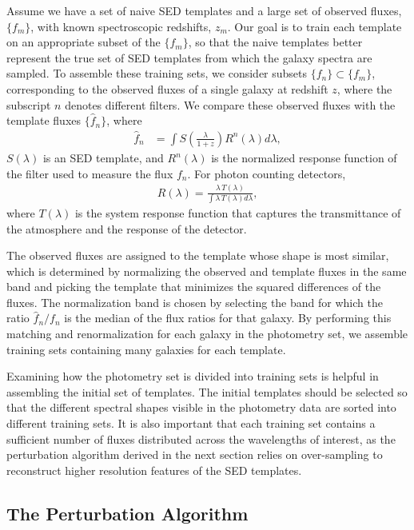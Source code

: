 Assume we have a set of naive SED templates and a large set of observed fluxes, $\{f_m\}$, with known spectroscopic redshifts, $z_m$. 
Our goal is to train each template on an appropriate subset of the $\{f_m\}$, so that the naive templates better represent the true set of SED templates from which the galaxy spectra are sampled. 
To assemble these training sets, we consider subsets $\{f_n\} \subset \{f_m\}$, corresponding to the observed fluxes of a single galaxy at redshift $z$, where the subscript $n$ denotes different filters. 
We compare these observed fluxes with the template fluxes $\{\hat{f}_n\}$, where
\begin{align}
    \hat{f}_n &= \int S\left(\frac{\lambda}{1+z}\right) R^n(\lambda) d\lambda, \label{eq:calc_flux1}
\end{align}
$S(\lambda)$ is an SED template, and $R^n(\lambda)$ is the normalized response function of the filter used to measure the flux $f_n$.
For photon counting detectors,
\begin{align}
    R(\lambda) = \frac{\lambda \, T(\lambda)}{\int \lambda \, T(\lambda) d\lambda},
\end{align}
where $T(\lambda)$ is the system response function that captures the transmittance of the atmosphere and the response of the detector.

The observed fluxes are assigned to the template whose shape is most similar, which is determined by normalizing the observed and template fluxes in the same band and picking the template that minimizes the squared differences of the fluxes. 
The normalization band is chosen by selecting the band for which the ratio $\hat{f}_n / f_n$ is the median of the flux ratios for that galaxy. 
By performing this matching and renormalization for each galaxy in the photometry set, we assemble training sets containing many galaxies for each template.

Examining how the photometry set is divided into training sets is helpful in assembling the initial set of templates. 
The initial templates should be selected so that the different spectral shapes visible in the photometry data are sorted into different training sets. 
It is also important that each training set contains a sufficient number of fluxes distributed across the wavelengths of interest, as the perturbation algorithm derived in the next section relies on over-sampling to reconstruct higher resolution features of the SED templates.




\subsection{The Perturbation Algorithm}
\label{sect:perturbation}

